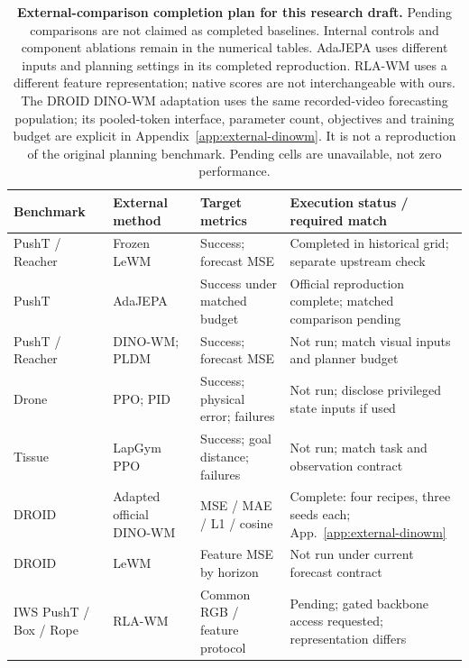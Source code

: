 \begin{table}[!htb]\centering\small
\setlength{\tabcolsep}{3pt}\renewcommand{\arraystretch}{1.10}
\begin{tabular}{@{}>{\raggedright\arraybackslash}p{.15\linewidth}>{\raggedright\arraybackslash}p{.23\linewidth}>{\raggedright\arraybackslash}p{.22\linewidth}>{\raggedright\arraybackslash}p{.31\linewidth}@{}}
\toprule Benchmark & External method & Target metrics & Execution status / required match \\ \midrule
PushT / Reacher & Frozen LeWM & Success; forecast MSE & Completed in historical grid; separate upstream check \\
PushT & AdaJEPA & Success under matched budget & Official reproduction complete; matched comparison pending \\
PushT / Reacher & DINO-WM; PLDM & Success; forecast MSE & Not run; match visual inputs and planner budget \\
Drone & PPO; PID & Success; physical error; failures & Not run; disclose privileged state inputs if used \\
Tissue & LapGym PPO & Success; goal distance; failures & Not run; match task and observation contract \\
DROID & Adapted official DINO-WM & MSE / MAE / L1 / cosine & Complete: four recipes, three seeds each; App.~\ref{app:external-dinowm} \\
DROID & LeWM & Feature MSE by horizon & Not run under current forecast contract \\
IWS PushT / Box / Rope & RLA-WM & Common RGB / feature protocol & Pending; gated backbone access requested; representation differs \\
\bottomrule\end{tabular}
\caption{\textbf{External-comparison completion plan for this research draft.}
Pending comparisons are not claimed as completed baselines. Internal controls and
component ablations remain in the numerical tables. AdaJEPA uses different inputs
and planning settings in its completed reproduction. RLA-WM uses a different
feature representation; native scores are not interchangeable with ours. The DROID DINO-WM adaptation uses the same recorded-video forecasting population; its pooled-token interface, parameter count, objectives and training budget are explicit in Appendix~\ref{app:external-dinowm}. It is not a reproduction of the original planning benchmark. Pending cells are unavailable, not zero performance.}
\label{tab:comparison-pending}\end{table}

